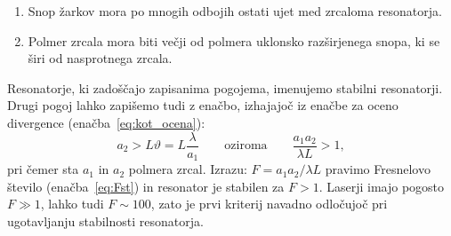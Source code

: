 \begin{enumerate} 
\item Snop žarkov mora po mnogih odbojih ostati ujet med zrcaloma resonatorja.
\item Polmer zrcala mora biti večji od polmera uklonsko razširjenega snopa, ki se širi od nasprotnega zrcala. 
\end{enumerate}

Resonatorje, ki zadoščajo zapisanima pogojema, imenujemo stabilni 
resonatorji.
Drugi pogoj lahko zapišemo tudi z enačbo, izhajajoč iz enačbe za oceno divergence (enačba~\ref{eq:kot_ocena}):
\begin{equation}
a_2 > L \vartheta = L\frac{\lambda}{a_1}\qquad \mathrm{oziroma} \qquad
\frac{a_{1}a_{2}}{\lambda L}>1,
\label{eq:Fresnelovo_stevilo}
\end{equation}
pri čemer sta $a_{1}$ in $a_{2}$ polmera zrcal. Izrazu:
$
F = a_{1}a_{2}/\lambda L
$
pravimo Fresnelovo število (enačba~\ref{eq:Fst})
in resonator je stabilen za $F>1$. Laserji imajo pogosto $F\gg 1$, lahko tudi $F \sim 100$, zato je 
prvi kriterij navadno odločujoč pri ugotavljanju stabilnosti resonatorja.


